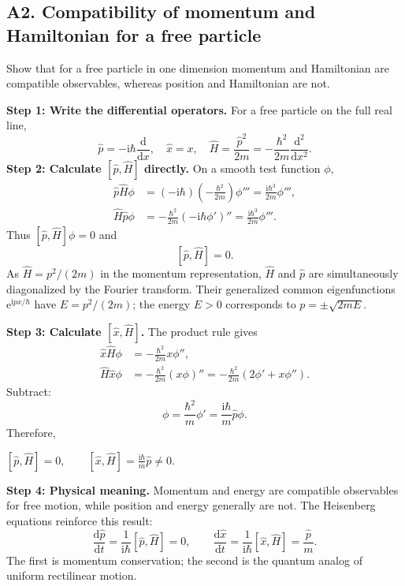 \documentclass[11pt,a4paper]{article}
\newcommand{\key}[1]{\begin{resultbox}\centering\(\displaystyle #1\)\end{resultbox}}
\newcommand{\dd}{\mathrm{d}}
\newcommand{\iu}{\mathrm{i}}
\newcommand{\ee}{\mathrm{e}}
\begin{document}
\subsection{A2. Compatibility of momentum and Hamiltonian for a free particle}
\begin{questionbox}
Show that for a free particle in one dimension momentum and Hamiltonian are compatible observables, whereas position and Hamiltonian are not.
\end{questionbox}
\textbf{Step 1: Write the differential operators.} For a free particle on the full real line,
\begin{equation}
\hat p=-\iu\hbar\frac{\dd}{\dd x},\quad \hat x=x,\quad\hat H=\frac{\hat p^2}{2m}=-\frac{\hbar^2}{2m}\frac{\dd^2}{\dd x^2}.
\end{equation}
\textbf{Step 2: Calculate $[\hat p,\hat H]$ directly.} On a smooth test function $\phi$,
\begin{align}
\hat p\hat H\phi&=(-\iu\hbar)\left(-\frac{\hbar^2}{2m}\right)\phi'''=\frac{\iu\hbar^3}{2m}\phi''',\\
\hat H\hat p\phi&=-\frac{\hbar^2}{2m}(-\iu\hbar\phi')''=\frac{\iu\hbar^3}{2m}\phi'''.
\end{align}
Thus $[\hat p,\hat H]\phi=0$ and
\begin{equation}\boxed{[\hat p,\hat H]=0.}\end{equation}
As $\hat H=p^2/(2m)$ in the momentum representation, $\hat H$ and $\hat p$ are simultaneously diagonalized by the Fourier transform. Their generalized common eigenfunctions $\ee^{\iu px/\hbar}$ have $E=p^2/(2m)$; the energy $E>0$ corresponds to $p=\pm\sqrt{2mE}$.

\textbf{Step 3: Calculate $[\hat x,\hat H]$.} The product rule gives
\begin{align}
\hat x\hat H\phi&=-\frac{\hbar^2}{2m}x\phi'',\\
\hat H\hat x\phi&=-\frac{\hbar^2}{2m}(x\phi)''=-\frac{\hbar^2}{2m}(2\phi'+x\phi'').
\end{align}
Subtract:
\begin{equation}
[\hat x,\hat H]\phi=\frac{\hbar^2}{m}\phi'=\frac{\iu\hbar}{m}\hat p\phi.
\end{equation}
Therefore,
\key{\boxed{[\hat p,\hat H]=0,\qquad[\hat x,\hat H]=\frac{\iu\hbar}{m}\hat p\neq0.}}
\textbf{Step 4: Physical meaning.} Momentum and energy are compatible observables for free motion, while position and energy generally are not. The Heisenberg equations reinforce this result:
\begin{equation}
\frac{\dd\hat p}{\dd t}=\frac{1}{\iu\hbar}[\hat p,\hat H]=0,\qquad
\frac{\dd\hat x}{\dd t}=\frac{1}{\iu\hbar}[\hat x,\hat H]=\frac{\hat p}{m}.
\end{equation}
The first is momentum conservation; the second is the quantum analog of uniform rectilinear motion.
\end{document}

